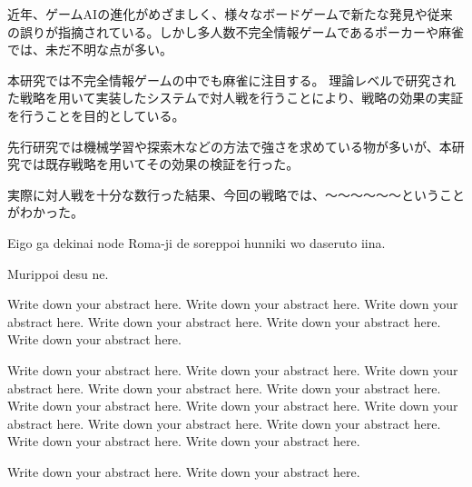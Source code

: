 
\begin{jabstract}

近年、ゲームAIの進化がめざましく、様々なボードゲームで新たな発見や従来の誤りが指摘されている。しかし多人数不完全情報ゲームであるポーカーや麻雀では、未だ不明な点が多い。

本研究では不完全情報ゲームの中でも麻雀に注目する。
理論レベルで研究された戦略を用いて実装したシステムで対人戦を行うことにより、戦略の効果の実証を行うことを目的としている。

先行研究では機械学習や探索木などの方法で強さを求めている物が多いが、本研究では既存戦略を用いてその効果の検証を行った。

実際に対人戦を十分な数行った結果、今回の戦略では、〜〜〜〜〜〜ということがわかった。

\end{jabstract}


\begin{eabstract}

Eigo ga dekinai node Roma-ji de soreppoi hunniki wo daseruto iina.

Murippoi desu ne.

Write down your abstract here. Write down your abstract here. Write down your abstract here. Write down your abstract here. Write down your abstract here. Write down your abstract here.

 Write down your abstract here. Write down your abstract here. Write down your abstract here. Write down your abstract here. Write down your abstract here. Write down your abstract here. Write down your abstract here. Write down your abstract here. Write down your abstract here. Write down your abstract here. Write down your abstract here. Write down your abstract here.

Write down your abstract here. Write down your abstract here.

\end{eabstract}
